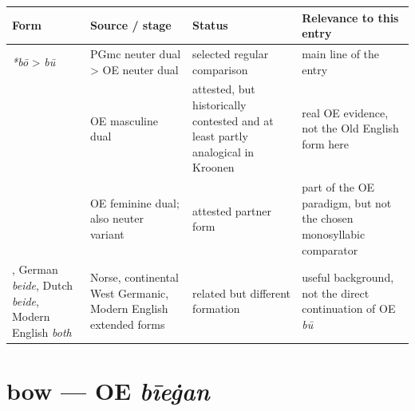 \documentclass[
  british,
  a4paper,
  openany]{book}
\newcounter{none} %
\providecommand{\texorpdfstring}[2]{#1}
\begin{document}
{\def\LTcaptype{none} %
\begin{longtable}[]{@{}
  >{\raggedright\arraybackslash}p{}
  >{\raggedright\arraybackslash}p{}
  >{\raggedright\arraybackslash}p{}
  >{\raggedright\arraybackslash}p{}@{}}
\toprule\noalign{}
\begin{minipage}[b]{\linewidth}\raggedright
Form
\end{minipage} & \begin{minipage}[b]{\linewidth}\raggedright
Source / stage
\end{minipage} & \begin{minipage}[b]{\linewidth}\raggedright
Status
\end{minipage} & \begin{minipage}[b]{\linewidth}\raggedright
Relevance to this entry
\end{minipage} \\
\midrule\noalign{}
\endhead
\bottomrule\noalign{}
\endlastfoot
{\emph{*bō}} \textgreater{} {\emph{bū}} & PGmc neuter dual
\textgreater{} OE neuter dual & selected regular comparison & main line
of the entry \\
{\emph{bēġen}} & OE masculine dual & attested, but historically
contested and at least partly analogical in Kroonen & real OE evidence,
not the Old English form here \\
{\emph{bā}} & OE feminine dual; also neuter variant & attested partner
form & part of the OE paradigm, but not the chosen monosyllabic
comparator \\
{\emph{báðir}}, German {\emph{beide}}, Dutch {\emph{beide}}, Modern
English {\emph{both}} & Norse, continental West Germanic, Modern English
extended forms & related but different formation & useful background,
not the direct continuation of OE \emph{bū} \\
\end{longtable}
}

\section{\texorpdfstring{bow --- OE
\emph{bīeġan}}{bow --- OE bīeġan}}\label{bow-oe-bux12beux121an}

\end{document}
